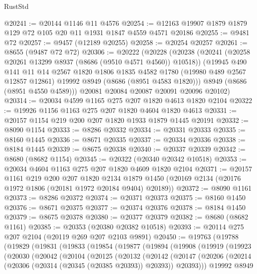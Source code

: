 \begin{lexlean}{RustStd}
\begin{coremodule}
@20241 := @20144 @1146 @11 @4576
@20254 := @12163 @19907 @1879 @1879 @129 @72 @105 @20 @11 @1931 @1847 @4559 @4571 @20186
@20255 := @9481 @72
@20257 := @9457 (@12189 @20255)
@20258 := @20254 @20257
@20261 := @8655 (@9487 @72 @72)
@20306 := @20222
    (@20228
      (@20238
        (@20241 (@20258 @20261 @13299 @8937 (@8686 (@9510 @4571 @4560)) @10518))
        (@19945
          @490
          @141
          @11
          @14
          @2567
          @1820
          @1806
          @1835
          @4582
          @1780
          (@19980 @489 @2567 @12857 @12861)
          @19992
          @8949
          (@8686 (@8951 @4583 @1820)))
        @8949
        (@8686 (@8951 @4550 @4589)))
      @20081
      @20084
      @20087
      @20091
      @20096
      @20102)
@20314 := @20034 @4599 @1165 @275 @207 @1820 @4613 @1820 @2104
@20322 := @19926 @1156 @1163 @275 @207 @1820 @4604 @1820 @4613
@20331 := @20157 @1154 @219 @200 @207 @1820 @1933 @1879 @1445 @20191
@20332 := @8090 @1154
@20333 := @8286 @20332
@20334 := @20331 @20333
@20335 := @8160 @1445
@20336 := @8671 @20335
@20337 := @20334 @20336
@20338 := @8184 @1445
@20339 := @8675 @20338
@20340 := @20337 @20339
@20342 := @8680 (@8682 @1154)
@20345 := @20322 (@20340 @20342 @10518)
@20353 := @20034 @4604 @1163 @275 @207 @1820 @4609 @1820 @2104
@20371 := @20157
    @1161
    @219
    @200
    @207
    @1820
    @2134
    @1879
    @1450
    (@20169 @2134 (@20176 @1972 @1806 (@20181 @1972 @20184 @9404) @20189))
@20372 := @8090 @1161
@20373 := @8286 @20372
@20374 := @20371 @20373
@20375 := @8160 @1450
@20376 := @8671 @20375
@20377 := @20374 @20376
@20378 := @8184 @1450
@20379 := @8675 @20378
@20380 := @20377 @20379
@20382 := @8680 (@8682 @1161)
@20385 := @20353 (@20380 @20382 @10518)
@20393 := @20114 @275 @207 @2104 (@20119 @269 @207 @2103 @9891)
@20450 := @19763
    (@19788
      (@19829
        (@19831
          (@19833
            (@19854
              (@19877
                (@19894
                  (@19908
                    (@19919
                      (@19923
                        (@20030
                          (@20042
                            (@20104
                              (@20125
                                (@20132
                                  (@20142
                                    (@20147
                                      (@20206
                                        (@20214
                                          (@20306 (@20314 (@20345 (@20385 @20393)) @20393))
                                          @20393)))
                                    @19992
                                    @8949

\end{coremodule}
\end{lexlean}
